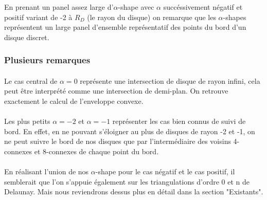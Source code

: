En prenant un panel assez large d'$\alpha$-shape avec $\alpha$ succéssivement négatif et positif variant de -2 à $R_D$ (le rayon du disque) on remarque que les $\alpha$-shapes représentent un large panel d'ensemble représentatif des points du bord d'un disque discret.


\subsubsection{Plusieurs remarques}

\paragraph{}
Le cas central de $\alpha = 0$ représente une intersection de disque de rayon infini, cela peut être interprété comme une intersection de demi-plan. On retrouve exactement le calcul de l'enveloppe convexe.

\paragraph{}
Les plus petits $\alpha = -2$ et $\alpha = -1$ représenter les cas bien connus de suivi de bord. En effet, en ne pouvant s'éloigner au plus de disques de rayon -2 et -1, on ne peut suivre le bord de nos disques que par l'intermédiaire des voisins 4-connexes et 8-connexes de chaque point du bord.

\paragraph{}
En réalisant l'union de nos $\alpha$-shape pour le cas négatif et le cas positif, il semblerait que l'on s'appuie également sur les triangulations d'ordre 0 et n de Delaunay. Mais nous reviendrons dessus plus en détail dans la section "Existants".\\

